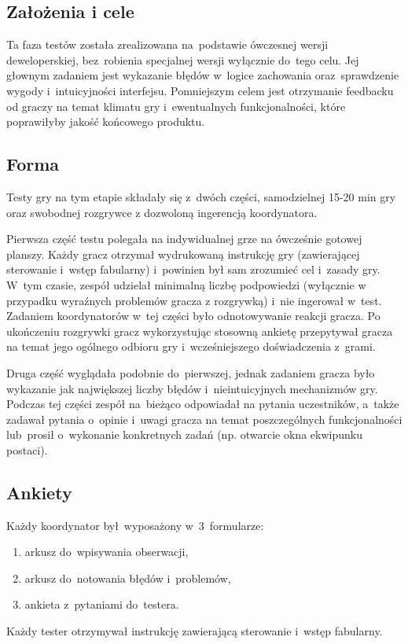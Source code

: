 \documentclass[licencjacka]{pracamgr}
\begin{document}
      \subsection{Założenia i cele}
      Ta faza testów została zrealizowana na~podstawie ówczesnej wersji deweloperskiej,
      bez~robienia specjalnej wersji wyłącznie do~tego celu. Jej głownym zadaniem jest
      wykazanie błędów w~logice zachowania oraz~sprawdzenie wygody i~intuicyjności interfejsu.
      Pomniejszym celem jest otrzymanie feedbacku od graczy na temat klimatu gry
      i~ewentualnych funkcjonalności, które poprawiłyby jakość końcowego produktu.

      \subsection{Forma}
      Testy gry na tym etapie składały się z~dwóch części, samodzielnej 15-20 min gry
      oraz swobodnej rozgrywce z dozwoloną ingerencją koordynatora.

      Pierwsza część testu polegała na indywidualnej grze na ówcześnie gotowej planszy.
      Każdy gracz otrzymał wydrukowaną instrukcję gry (zawierającej sterowanie i~wstęp fabularny)
      i~powinien był sam zrozumieć cel i~zasady gry. W~tym czasie, zespół udzielał minimalną liczbę
      podpowiedzi (wyłącznie w przypadku wyraźnych problemów gracza z rozgrywką) i~nie ingerował w~test.
      Zadaniem koordynatorów w~tej części było odnotowywanie reakcji gracza.
      Po ukończeniu rozgrywki gracz wykorzystując stosowną ankietę przepytywał gracza na temat
      jego ogólnego odbioru gry i~wcześniejszego doświadczenia z~grami.

      Druga część wyglądała podobnie do~pierwszej, jednak zadaniem gracza było wykazanie
      jak największej liczby błędów i~nieintuicyjnych mechanizmów gry.
      Podczas tej części zespół na~bieżąco odpowiadał na pytania uczestników,
      a~także zadawał pytania o~opinie i~uwagi gracza na temat poszczególnych funkcjonalności
      lub~prosił o~wykonanie konkretnych zadań (np. otwarcie okna ekwipunku postaci).

      \subsection{Ankiety}
      Każdy koordynator był~wyposażony w~3~formularze:
      \begin{enumerate}
	\item arkusz do~wpisywania obserwacji,
	\item arkusz do~notowania błędów i~problemów,
	\item ankieta z~pytaniami do~testera.
      \end{enumerate}
      Każdy tester otrzymywał instrukcję zawierającą sterowanie i~wstęp fabularny.
\end{document}

